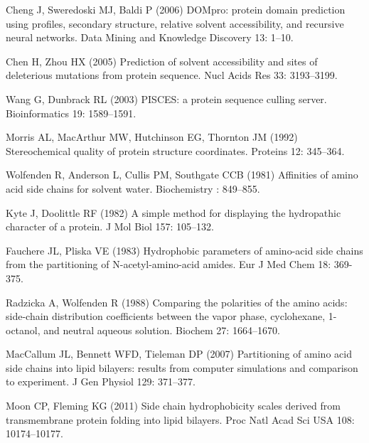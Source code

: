 \documentclass[11pt]{article}
\begin{document}
\begin{thebibliography}{10}
Cheng J, Sweredoski MJ, Baldi P (2006) {DOMpro:} protein domain prediction
  using profiles, secondary structure, relative solvent accessibility, and
  recursive neural networks.
\newblock Data Mining and Knowledge Discovery 13: 1--10.

Chen H, Zhou HX (2005) Prediction of solvent accessibility and sites of
  deleterious mutations from protein sequence.
\newblock Nucl Acids Res 33: 3193--3199.

Wang G, Dunbrack RL (2003) {PISCES:} a protein sequence culling server.
\newblock Bioinformatics 19: 1589--1591.

Morris AL, MacArthur MW, Hutchinson EG, Thornton JM (1992) Stereochemical
  quality of protein structure coordinates.
\newblock Proteins 12: 345--364.

Wolfenden R, Anderson L, Cullis PM, Southgate CCB (1981) Affinities of amino
  acid side chains for solvent water.
\newblock Biochemistry : 849--855.

Kyte J, Doolittle RF (1982) A simple method for displaying the hydropathic
  character of a protein.
\newblock J Mol Biol 157: 105--132.

Fauchere JL, Pliska VE (1983) Hydrophobic parameters of amino-acid side chains
  from the partitioning of {N-acetyl-amino-acid} amides.
\newblock Eur J Med Chem 18: 369-375.

Radzicka A, Wolfenden R (1988) Comparing the polarities of the amino acids:
  side-chain distribution coefficients between the vapor phase, cyclohexane,
  1-octanol, and neutral aqueous solution.
\newblock Biochem 27: 1664--1670.

MacCallum JL, Bennett WFD, Tieleman DP (2007) Partitioning of amino acid side
  chains into lipid bilayers: results from computer simulations and comparison
  to experiment.
\newblock J Gen Physiol 129: 371--377.

Moon CP, Fleming KG (2011) Side chain hydrophobicity scales derived from
  transmembrane protein folding into lipid bilayers.
\newblock Proc Natl Acad Sci USA 108: 10174--10177.


\end{thebibliography}
\end{document}
